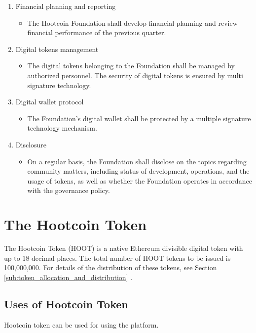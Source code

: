 \documentclass{article}
\begin{document}
\begin{enumerate}
 \item Financial planning and reporting
 \begin{itemize}
  \item The Hootcoin Foundation shall develop financial planning and review financial performance of the previous quarter.
 \end{itemize}

 \item Digital tokens management
  \begin{itemize}
  \item The digital tokens belonging to the Foundation shall be managed by authorized personnel. The security of digital tokens is ensured by multi signature technology.
 \end{itemize}

 \item Digital wallet protocol
  \begin{itemize}
  \item The Foundation’s digital wallet shall be protected by a multiple signature technology mechanism.
 \end{itemize}

 \item Disclosure
  \begin{itemize}
  \item On a regular basis, the Foundation shall disclose on the topics regarding community matters, including status of development, operations, and the usage of tokens, as well as whether the Foundation operates in accordance with the governance policy.
 \end{itemize}
\end{enumerate}


\section{The Hootcoin Token}
The Hootcoin Token (HOOT) is a native Ethereum divisible digital token with up to 18 decimal places. The total number of HOOT tokens to be issued is 100,000,000. For details of the distribution of these tokens, see Section \ref{sub:token_allocation_and_distribution} .

\subsection{Uses of Hootcoin Token} %
\label{sub:uses_of_hoot_token}
Hootcoin token can be used for using the platform.
\end{document}
